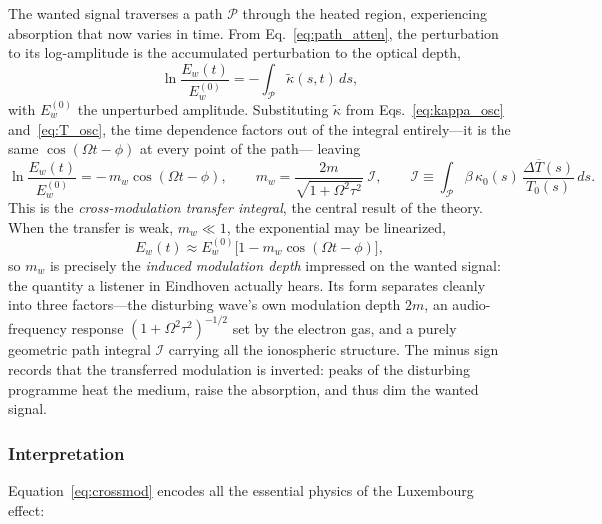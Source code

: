 \documentclass[12pt]{article}
\begin{document}
The wanted signal traverses a path $\mathcal{P}$ through the heated region, experiencing
absorption that now varies in time.  From Eq.~\eqref{eq:path_atten}, the perturbation to
its log-amplitude is the accumulated perturbation to the optical depth,
\begin{equation}
  \ln\frac{E_w(t)}{E_w^{(0)}} = -\int_{\mathcal{P}} \widetilde{\kappa}(s,t)\,ds ,
  \label{eq:logamp}
\end{equation}
with $E_w^{(0)}$ the unperturbed amplitude.  Substituting $\widetilde{\kappa}$ from
Eqs.~\eqref{eq:kappa_osc} and~\eqref{eq:T_osc}, the time dependence factors out of the
integral entirely---it is the same $\cos(\Omega t - \phi)$ at every point of the path---
leaving
\begin{equation}
  \boxed{
  \ln\frac{E_w(t)}{E_w^{(0)}} = -\,m_w\cos(\Omega t - \phi),
  \qquad
  m_w = \frac{2m}{\sqrt{1+\Omega^2\tau^2}}\;\mathcal{I},
  \qquad
  \mathcal{I} \equiv \int_{\mathcal{P}}
    \beta\,\kappa_0(s)\,\frac{\Delta\overline{T}(s)}{T_0(s)}\,ds .
  }
  \label{eq:crossmod}
\end{equation}
This is the \emph{cross-modulation transfer integral}, the central result of the theory.
When the transfer is weak, $m_w \ll 1$, the exponential may be linearized,
\begin{equation}
  E_w(t) \approx E_w^{(0)}\bigl[1 - m_w\cos(\Omega t - \phi)\bigr],
  \label{eq:mw}
\end{equation}
so $m_w$ is precisely the \emph{induced modulation depth} impressed on the wanted signal:
the quantity a listener in Eindhoven actually hears.  Its form separates cleanly into three
factors---the disturbing wave's own modulation depth $2m$, an audio-frequency response
$(1+\Omega^2\tau^2)^{-1/2}$ set by the electron gas, and a purely geometric path integral
$\mathcal{I}$ carrying all the ionospheric structure.  The minus sign records that the
transferred modulation is inverted: peaks of the disturbing programme heat the medium,
raise the absorption, and thus dim the wanted signal.

\subsubsection{Interpretation}

Equation~\eqref{eq:crossmod} encodes all the essential physics of the Luxembourg effect:
\end{document}
